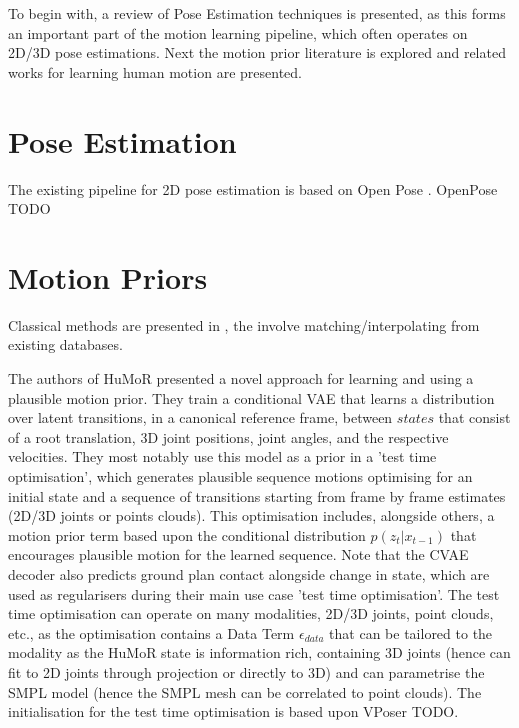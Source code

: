 To begin with, a review of Pose Estimation techniques is presented, as this forms an important part of the motion learning pipeline, which often operates on 2D/3D pose estimations. Next the motion prior literature is explored and related works for learning human motion are presented.


\section{Pose Estimation}
The existing pipeline for 2D pose estimation is based on Open Pose \cite{openPose}. OpenPose TODO


\section{Motion Priors}

Classical methods are presented in \cite{DeepPhase}, the involve matching/interpolating from existing databases.

The authors of HuMoR \cite{humor} presented a novel approach for learning and using a plausible motion prior. They train a conditional VAE that learns a distribution over latent transitions, in a canonical reference frame, between $\textit{states}$ that consist of a root translation, 3D joint positions, joint angles, and the respective velocities. They most notably use this model as a prior in a 'test time optimisation', which generates plausible sequence motions optimising for an initial state and a sequence of transitions starting from frame by frame estimates (2D/3D joints or points clouds). This optimisation includes, alongside others, a motion prior term based upon the conditional distribution $p(z_t|x_{t-1})$ that encourages plausible motion for the learned sequence. Note that the CVAE decoder also predicts ground plan contact alongside change in state, which are used as regularisers during their main use case 'test time optimisation'. The test time optimisation can operate on many modalities, 2D/3D joints, point clouds, etc., as the optimisation contains a Data Term $\epsilon_{data}$ that can be tailored to the modality as the HuMoR state is information rich, containing 3D joints (hence can fit to 2D joints through projection or directly to 3D) and can parametrise the SMPL model (hence the SMPL mesh can be correlated to point clouds). The initialisation for the test time optimisation is based upon VPoser TODO. 

